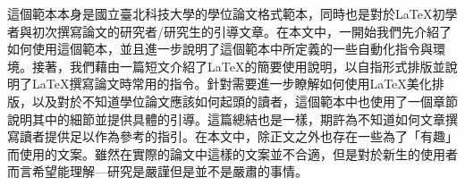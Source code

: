 \documentclass[12pt]{report}
\theoremstyle{plain}
\renewcommand{\schoolzh}{國立臺北科技大學}
\begin{document}
這個範本本身是\schoolzh{}的學位論文格式範本，同時也是對於\LaTeX{}初學者與初次撰寫論文的研究者/研究生的引導文章。在本文中，一開始我們先介紹了如何使用這個範本，並且進一步說明了這個範本中所定義的一些自動化指令與環境。接著，我們藉由一篇短文介紹了\LaTeX{}的簡要使用說明，以自指形式排版並說明了\LaTeX{}撰寫論文時常用的指令。針對需要進一步瞭解如何使用\LaTeX{}美化排版，以及對於不知道學位論文應該如何起頭的讀者，這個範本中也使用了一個章節說明其中的細節並提供具體的引導。這篇總結也是一樣，期許為不知道如何文章撰寫讀者提供足以作為參考的指引。在本文中，除正文之外也存在一些為了「有趣」而使用的文案。雖然在實際的論文中這樣的文案並不合適，但是對於新生的使用者而言希望能理解---研究是嚴謹但是並不是嚴肅的事情。

\clearpage
{}


\end{document}

